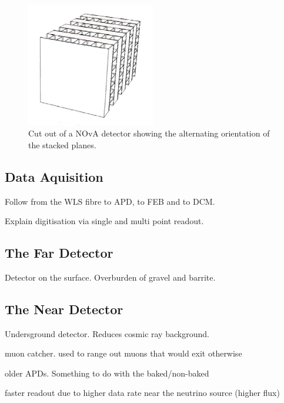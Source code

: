 \begin{figure}
  \centering
  \includegraphics[width=0.5\textwidth]{../../img/det/gen/planes.png}
  \caption{Cut out of a NOvA detector showing the alternating
    orientation of the stacked planes.}
  \label{fig:stackedPlanes}
\end{figure}




\subsection{Data Aquisition}

Follow from the WLS fibre to APD, to FEB and to DCM.

Explain digitisation via single and multi point readout.


\subsection{The Far Detector}\label{sec:fardet}

Detector on the surface. Overburden of gravel and barrite.

\subsection{The Near Detector}\label{sec:neardet}

Undersground detector. Reduces cosmic ray background.

muon catcher. used to range out muons that would exit otherwise

older APDs. Something to do with the baked/non-baked

faster readout due to higher data rate near the neutrino source
(higher flux)